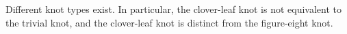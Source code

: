 Different knot types exist. In particular, the clover-leaf knot is not equivalent to the trivial knot, and the clover-leaf knot is distinct from the figure-eight knot.
